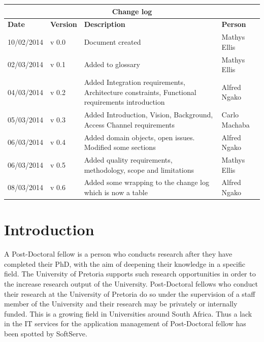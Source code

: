\documentclass[12pt]{article}
\begin{document}
	\begin{center}
		\begin{tabular}{|l|p{1.4cm}|p{8cm}|p{2.8cm}|}
			\hline
			\multicolumn{4}{|c|}{\bf Change log} \\
			\hline
			\bf Date & \bf Version & \bf Description & \bf Person \\
			\hline
			10/02/2014 & v 0.0 & Document created & Mathys Ellis \\
			\hline
			02/03/2014 & v 0.1 & Added to glossary & Mathys Ellis \\
			\hline
			04/03/2014 & v 0.2 & Added Integration requirements, Architecture constraints, Functional requirements introduction   & Alfred Ngako \\
			\hline
			05/03/2014 & v 0.3 & Added Introduction, Vision, Background, Access Channel requirements & Carlo Machaba \\
			\hline
			06/03/2014 & v 0.4 & Added domain objects, open issues. Modified some sections  & Alfred Ngako \\
			\hline
			06/03/2014 & v 0.5 & Added quality requirements, methodology, scope and limitations  & Mathys Ellis \\
			\hline
			08/03/2014 & v 0.6 & Added some wrapping to the change log which is now a table  & Alfred Ngako \\
			\hline
			
		\end{tabular}
	\end{center}
	\newpage
		\tableofcontents
			
		\listoffigures
	\newpage
	\section{Introduction} %
	A Post-Doctoral fellow is a person who conducts research after they have completed their PhD, with the aim of deepening their knowledge in a specific field. The University of Pretoria supports such research opportunities in order to the increase research output of the University. Post-Doctoral fellows who conduct their research at the University of Pretoria do so under the supervision of a staff member of the University and their research may be privately or internally funded. This is a growing field in Universities around South Africa. Thus a lack in the IT services for the application management of Post-Doctoral fellow has been spotted by SoftServe.  
	\vspace{0.2in}
\end{document}
